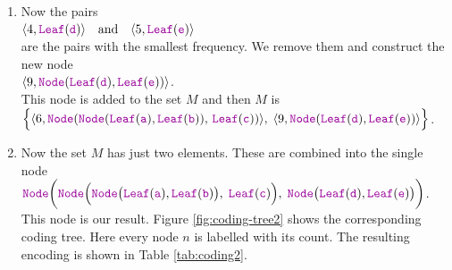 \begin{enumerate}
      These pairs are removed from $M$ and replaced by 
      \\[0.2cm]
      \hspace*{0.3cm}
      $ \langle 6, \mytt{Node}(
           \mytt{Node}(\mytt{Leaf}(\mytt{a}), \mytt{Leaf}(\mytt{b})),\; 
           \mytt{Leaf}(\mytt{c}))\rangle$. 
      \\[0.2cm]
      Then $M$ is given as
      \\[0.2cm]
      \hspace*{0.3cm}
      $ \Bigl\{ 
        \langle 4, \mytt{Leaf}(\mytt{d}) \rangle,\;\langle 5, \mytt{Leaf}(\mytt{e}) \rangle,\;
        \langle 6, \mytt{Node}(
           \mytt{Node}(\mytt{Leaf}(\mytt{a}), \mytt{Leaf}(\mytt{b})),\; 
           \mytt{Leaf}(\mytt{c}))\Bigr\}. $
\item Now the pairs
      \\[0.2cm]
      \hspace*{0.3cm}
      $ \langle 4, \mytt{Leaf}(\mytt{d}) \rangle \quad \mathrm{and} \quad \langle 5, \mytt{Leaf}(\mytt{e}) \rangle$
      \\[0.2cm]
      are the pairs with the smallest frequency.
      We remove them and construct the new node \\[0.2cm]
      \hspace*{0.3cm}
      $\langle 9, \mytt{Node}(\mytt{Leaf}(\mytt{d}), \mytt{Leaf}(\mytt{e})) \rangle$.
      \\[0.2cm]
      This node is added to the set  $M$ and then $M$ is
      \\[0.2cm]
      \hspace*{0.3cm}
      $ \Bigl\{ 
        \langle 6, \mytt{Node}(
           \mytt{Node}(\mytt{Leaf}(\mytt{a}),
           \mytt{Leaf}(\mytt{b})),\,\mytt{Leaf}(\mytt{c}))
        \rangle,\;
        \langle 9,\mytt{Node}(\mytt{Leaf}(\mytt{d}), \mytt{Leaf}(\mytt{e})) \rangle
        \Bigr\}
           $.      
\item Now the set $M$ has just two elements.  These are combined into the single node 
      \\[0.2cm]
      \hspace*{0.3cm}
      $\mytt{Node}\biggl(
              \mytt{Node}\Bigl(
                 \mytt{Node}\bigl(\mytt{Leaf}(\mytt{a}), \mytt{Leaf}(\mytt{b})\bigr),\; 
                 \mytt{Leaf}(\mytt{c})\Bigr),\;
              \mytt{Node}\bigl(\mytt{Leaf}(\mytt{d}), \mytt{Leaf}(\mytt{e})\bigr)
         \biggr)
      $.
      \\[0.2cm]
      This node is our result.  Figure 
      \ref{fig:coding-tree2} shows the corresponding coding tree.  Here every node $n$ is labelled with its
      count.  The resulting encoding is shown in Table  \ref{tab:coding2}.
\end{enumerate}

